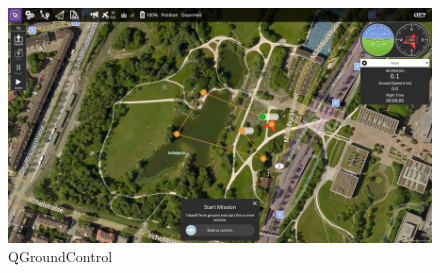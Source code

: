 \begin{figure} [h]
  \begin{center}
    \includegraphics[scale=1.2]{figs/Plataformas_Desarollo/software-qgc.jpg}
  \end{center}
  \caption{QGroundControl}
  \label{fig:QGroundControl}
\end{figure}


































